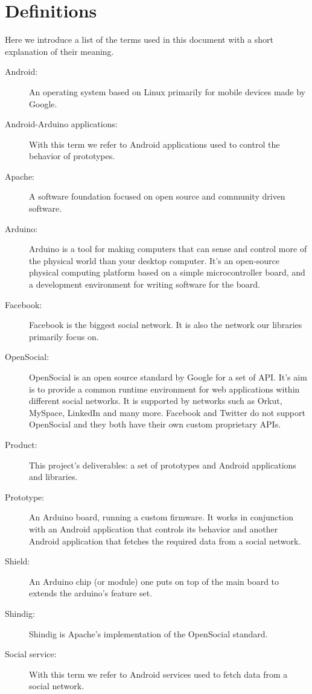 \section{Definitions}

Here we introduce a list of the terms used in this document with a short explanation of their meaning.

\begin{description}
\item[Android:] An operating system based on Linux primarily for mobile devices made by Google.
\item[Android-Arduino applications:] With this term we refer to Android applications used to control the behavior of prototypes.
\item[Apache:] A software foundation focused on open source and community driven software.
\item[Arduino:] Arduino is a tool for making computers that can sense and control more of the physical world than your
desktop computer. It's an open-source physical computing platform based on a simple microcontroller board, and a development
environment for writing software for the board. \cite{link:arduino}
\item[Facebook:] Facebook is the biggest social network. It is also the network our libraries primarily focus on.
\item[OpenSocial:] OpenSocial\cite{link:opensocial} is an open source standard by Google for a set of API. It's aim is to
provide a common runtime environment for web applications within different social networks. It is supported by networks
such as Orkut, MySpace, LinkedIn and many more. Facebook and Twitter do not support OpenSocial and they both have their
own custom proprietary APIs.
\item[Product:] This project's deliverables: a set of prototypes and Android applications and libraries.
\item[Prototype:] An Arduino board, running a custom firmware. It works in conjunction with an Android application
that controls its behavior and another Android application that fetches the required data from a social network.
\item[Shield:] An Arduino chip (or module) one puts on top of the main board to extends the arduino's feature set.
\item[Shindig:] Shindig is Apache's implementation of the OpenSocial standard.
\item[Social service:] With this term we refer to Android services used to fetch data from a social network.
\end{description}
